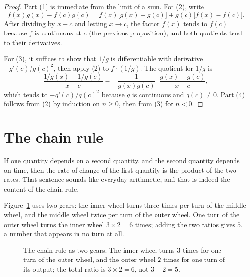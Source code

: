 \begin{proof}
Part (1) is immediate from the limit of a sum. For (2), write
\[
  f(x)g(x)-f(c)g(c)=f(x)\bigl[g(x)-g(c)\bigr]+g(c)\bigl[f(x)-f(c)\bigr].
\]
After dividing by $x-c$ and letting $x\to c$, the factor $f(x)$ tends to $f(c)$ because $f$ is
continuous at $c$ (the previous proposition), and both quotients tend to their derivatives.

For (3), it suffices to show that $1/g$ is differentiable with derivative $-g'(c)/g(c)^{2}$,
then apply (2) to $f\cdot(1/g)$. The quotient for $1/g$ is
\[
  \frac{1/g(x)-1/g(c)}{x-c}
  =-\frac{1}{g(x)g(c)}\cdot\frac{g(x)-g(c)}{x-c},
\]
which tends to $-g'(c)/g(c)^{2}$ because $g$ is continuous and $g(c)\neq0$. Part (4) follows
from (2) by induction on $n\ge0$, then from (3) for $n<0$.
\end{proof}
\section{The chain rule}

If one quantity depends on a second quantity, and the second quantity depends on time, then
the rate of change of the first quantity is the product of the two rates. That sentence sounds
like everyday arithmetic, and that is indeed the content of the chain rule.

Figure~\ref{fig:roda-gigi} uses two gears: the inner wheel turns three times per turn of the
middle wheel, and the middle wheel twice per turn of the outer wheel. One turn of the outer
wheel turns the inner wheel $3\times2=6$ times; adding the two ratios gives $5$, a number that
appears in no turn at all.

\begin{figure}[htbp]
\centering
{}
\caption{The chain rule as two gears. The inner wheel turns $3$ times for one turn of the
outer wheel, and the outer wheel $2$ times for one turn of its output; the total ratio is
$3\times2=6$, not $3+2=5$.}
\label{fig:roda-gigi}
\end{figure}

